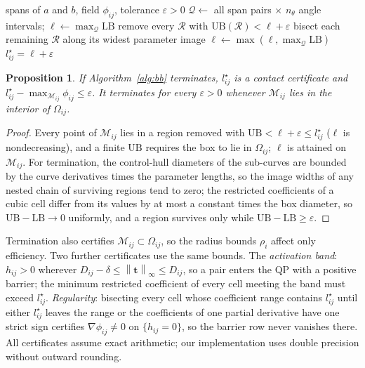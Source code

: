 \documentclass[journal]{IEEEtran}
\newtheorem{proposition}{Proposition}
\theoremstyle{definition}
\newcommand{\norm}[1]{\left\lVert #1\right\rVert}
\newcommand{\Mset}{\mathcal{M}}
\begin{document}
\begin{algorithm}[t]
\caption{Contact certificate for a pair $(i,j)$}\label{alg:bb}
\begin{algorithmic}[1]
\Require spans of $a$ and $b$, field $\phi_{ij}$, tolerance $\varepsilon>0$
\State $\mathcal Q\gets$ all span pairs $\times$ $n_\theta$ angle intervals;
$\ell\gets\max_{\mathcal Q}\mathrm{LB}$
  \State remove every $\mathcal R$ with $\mathrm{UB}(\mathcal R)<\ell+\varepsilon$
  \State bisect each remaining $\mathcal R$ along its widest parameter image
  \State $\ell\gets\max(\ell,\max_{\mathcal Q}\mathrm{LB})$
\EndWhile
\State \Return $l^\star_{ij}=\ell+\varepsilon$
\end{algorithmic}
\end{algorithm}

\begin{proposition}\label{prop:bb}
If Algorithm~\ref{alg:bb} terminates, $l^\star_{ij}$ is a contact certificate and
$l^\star_{ij}-\max_{\Mset_{ij}}\phi_{ij}\le\varepsilon$. It terminates for every $\varepsilon>0$
whenever $\Mset_{ij}$ lies in the interior of $\Omega_{ij}$.
\end{proposition}
\begin{proof}
Every point of $\Mset_{ij}$ lies in a region removed with $\mathrm{UB}<\ell+\varepsilon\le
l^\star_{ij}$ ($\ell$ is nondecreasing), and a finite $\mathrm{UB}$ requires the box to lie in
$\Omega_{ij}$; $\ell$ is attained on $\Mset_{ij}$. For termination, the control-hull diameters of the
sub-curves are bounded by the curve derivatives times the parameter lengths, so the image widths of
any nested chain of surviving regions tend to zero; the restricted coefficients of a cubic cell
differ from its values by at most a constant times the box diameter, so
$\mathrm{UB}-\mathrm{LB}\to0$ uniformly, and a region survives only while
$\mathrm{UB}-\mathrm{LB}\ge\varepsilon$.
\end{proof}
Termination also certifies $\Mset_{ij}\subset\Omega_{ij}$, so the radius bounds $\rho_i$ affect only
efficiency. Two further certificates use the same bounds. The \emph{activation band}: $h_{ij}>0$
wherever $D_{ij}-\delta\le\norm{\mathbf t}_\infty\le D_{ij}$, so a pair enters the QP with a positive
barrier; the minimum restricted coefficient of every cell meeting the band must exceed $l^\star_{ij}$.
\emph{Regularity}: bisecting every cell whose coefficient range contains $l^\star_{ij}$ until either
$l^\star_{ij}$ leaves the range or the coefficients of one partial derivative have one strict sign
certifies $\nabla\phi_{ij}\neq0$ on $\{h_{ij}=0\}$, so the barrier row never vanishes there. All
certificates assume exact arithmetic; our implementation uses double precision without outward
rounding.
\end{document}
